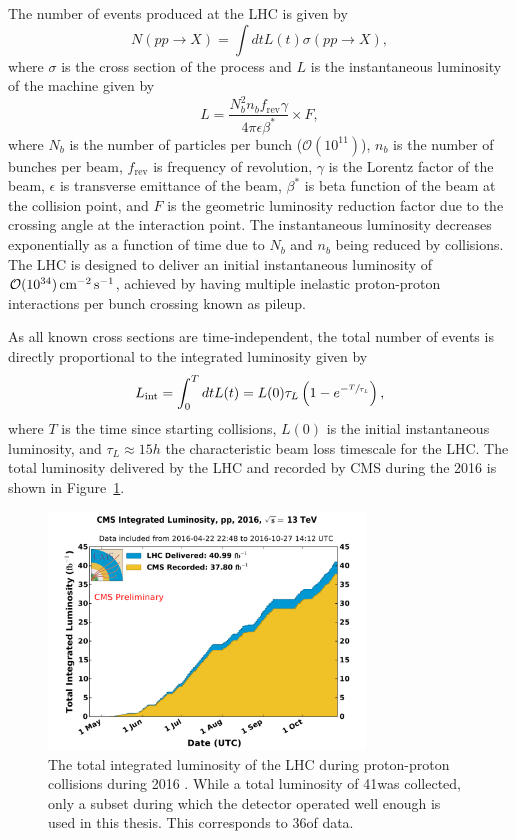 The number of events produced at the LHC is given by
\begin{equation}
  N(pp \rightarrow X) = \int dt L(t) \sigma(pp \rightarrow X),
\end{equation}
where $\sigma$ is the cross section of the process and $L$ is the instantaneous luminosity of the machine given by
\begin{equation}
  L = \frac{N_b^2 n_b f_{\text{rev}} \gamma}{4 \pi \epsilon \beta^*} \times F,
\end{equation}
where $N_b$ is the number of particles per bunch ($\mathcal{O}(10^{11})$),
$n_b$ is the number of bunches per beam,
$f_{\text{rev}}$ is frequency of revolution,
$\gamma$ is the Lorentz factor of the beam,
$\epsilon$ is transverse emittance of the beam,
$\beta^*$ is beta function of the beam at the collision point,
and $F$ is the geometric luminosity reduction factor due to the crossing angle at the interaction point.
The instantaneous luminosity decreases exponentially as a function of time due to $N_b$ and $n_b$ being reduced by collisions.
The LHC is designed to deliver an initial instantaneous luminosity of $\mathcal{O}(10^{34}) \,\text{cm}^{-2}\,\text{s}^{-1}$, achieved by having multiple inelastic proton-proton interactions per bunch crossing known as pileup.

As all known cross sections are time-independent, the total number of events is directly proportional to the integrated luminosity given by
\begin{equation}
  L_{\text{int}} = \int_0^T dt L(t) = L(0) \tau_L \left(1 - e^{-\sfrac{T}{\tau_L}} \right),
\end{equation}
where $T$ is the time since starting collisions,
$L(0)$ is the initial instantaneous luminosity,
and $\tau_L \approx 15\unit{h}$ the characteristic beam loss timescale for the LHC.
The total luminosity delivered by the LHC and recorded by CMS during the 2016 is shown in Figure~\ref{fig:lumi}.

\begin{figure}[htbp]
  \centering
  \includegraphics[width=0.75\textwidth]{Collider/Figures/lumi_2016.pdf}
  \caption{
    The total integrated luminosity of the LHC during proton-proton collisions during 2016 \cite{LumiTwiki}.
    While a total luminosity of 41\fbinv was collected, only a subset during which the detector operated well enough is used in this thesis. This corresponds to 36\fbinv of data.
  }
  \label{fig:lumi}
\end{figure}

